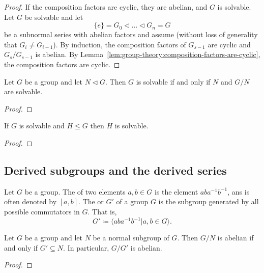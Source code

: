 \begin{proof}
  If the composition factors are cyclic, they are abelian, and \(G\) is solvable. Let \(G\) be solvable and let
  \[\{e\} = G_{0} \triangleleft \ldots \triangleleft G_{n} = G\]
  be a subnormal series with abelian factors and assume (without loss of generality that \(G_{i} \neq G_{i-1}\)). By induction, the composition factors of \(G_{s-1}\) are cyclic and \(G_{s}/G_{s-1}\) is abelian. By Lemma~\ref{lem:group-theory:composition-factors-are-cyclic}, the composition factors are cyclic.
\end{proof}

\begin{theorem}
  Let \(G\) be a group and let \(N \triangleleft G\). Then \(G\) is solvable if and only if \(N\) and \(G/N\) are solvable.
\end{theorem}

\begin{proof}
\end{proof}

\begin{theorem}
  If \(G\) is solvable and \(H \leq G\) then \(H\) is solvable.
\end{theorem}

\begin{proof}
\end{proof}

\subsection{Derived subgroups and the derived series}

\begin{definition}
  Let \(G\) be a group. The  of two elements \(a, b \in G\) is the element \(aba^{-1}b^{-1}\), ans is often denoted by \([a,b]\). The  or  \(G'\) of a group \(G\) is the subgroup generated by all possible commutators in \(G\). That is,
  \[G' \coloneqq \langle aba^{-1}b^{-1} | a, b \in G \rangle.\]
\end{definition}

\begin{theorem}
  Let \(G\) be a group and let \(N\) be a normal subgroup of \(G\). Then \(G / N\) is abelian if and only if \(G' \subseteq N\). In particular, \(G/G'\) is abelian.
\end{theorem}

\begin{proof}
\end{proof}

